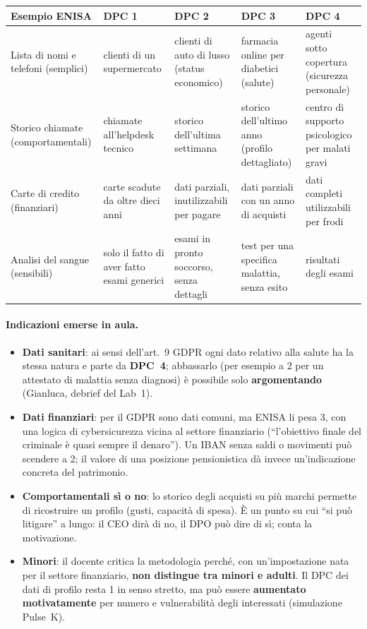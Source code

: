 \begin{center}
\small
\begin{tabularx}{\linewidth}{>{\raggedright\arraybackslash}p{3.3cm} X X X X}
\toprule
\textbf{Esempio ENISA} & \textbf{DPC 1} & \textbf{DPC 2} & \textbf{DPC 3} & \textbf{DPC 4}\\
\midrule
Lista di nomi e telefoni (semplici) & clienti di un supermercato & clienti di auto di lusso (status
  economico) & farmacia online per diabetici (salute) & agenti sotto copertura (sicurezza personale)\\
Storico chiamate (comportamentali) & chiamate all'helpdesk tecnico & storico dell'ultima settimana &
  storico dell'ultimo anno (profilo dettagliato) & centro di supporto psicologico per malati gravi\\
Carte di credito (finanziari) & carte scadute da oltre dieci anni & dati parziali, inutilizzabili per
  pagare & dati parziali con un anno di acquisti & dati completi utilizzabili per frodi\\
Analisi del sangue (sensibili) & solo il fatto di aver fatto esami generici & esami in pronto soccorso,
  senza dettagli & test per una specifica malattia, senza esito & risultati degli esami\\
\bottomrule
\end{tabularx}
\end{center}

\paragraph{Indicazioni emerse in aula.}
\begin{itemize}
  \item \textbf{Dati sanitari}: ai sensi dell'art.~9 GDPR ogni dato relativo alla salute ha la stessa
    natura e parte da \textbf{DPC~4}; abbassarlo (per esempio a 2 per un attestato di malattia senza
    diagnosi) è possibile solo \textbf{argomentando} (Gianluca, debrief del Lab~1).
  \item \textbf{Dati finanziari}: per il GDPR sono dati comuni, ma ENISA li pesa 3, con una logica di
    cybersicurezza vicina al settore finanziario (``l'obiettivo finale del criminale è quasi sempre il
    denaro''). Un IBAN senza saldi o movimenti può scendere a 2; il valore di una posizione pensionistica
    dà invece un'indicazione concreta del patrimonio.
  \item \textbf{Comportamentali sì o no}: lo storico degli acquisti su più marchi permette di ricostruire
    un profilo (gusti, capacità di spesa). È un punto su cui ``si può litigare'' a lungo: il CEO dirà di
    no, il DPO può dire di sì; conta la motivazione.
  \item \textbf{Minori}: il docente critica la metodologia perché, con un'impostazione nata per il
    settore finanziario, \textbf{non distingue tra minori e adulti}. Il DPC dei dati di profilo resta 1 in
    senso stretto, ma può essere \textbf{aumentato motivatamente} per numero e vulnerabilità degli
    interessati (simulazione Pulse~K).
\end{itemize}

